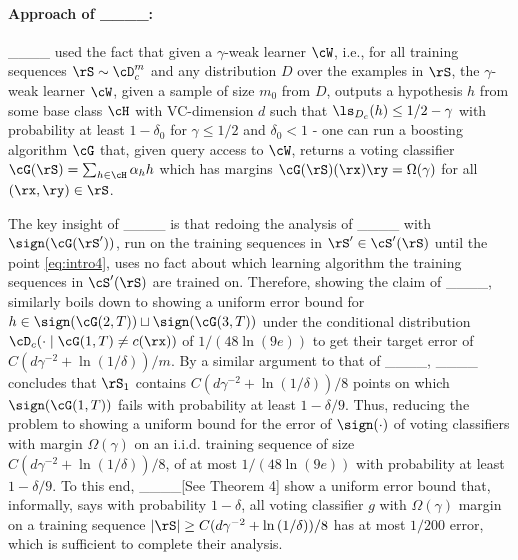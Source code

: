\paragraph{Approach of ____:}
____ used the fact that given a $\gamma$-weak learner $ \cW $, i.e., for all training sequences $\rS\sim \cD_{c}^{m}$ and any distribution $D$ over the examples in $\rS$, the $ \gamma $-weak learner $\cW$, given a sample of size $m_{0}$ from $D$, outputs a hypothesis $h$ from some base class $\cH$ with VC-dimension $d$ such that $\ls_{D_{c}}(h)\leq 1/2-\gamma$ with probability at least $1-\delta_{0}$ for $\gamma\leq 1/2$ and $\delta_{0}< 1$ - one can run a boosting algorithm $\cG$ that, given query access to $\cW$, returns a voting classifier $\cG(\rS)=\sum_{h\in \cH} \alpha_{h}h$ which has margins $\cG(\rS)(\rx)\ry=\Omega(\gamma)$ for all $(\rx,\ry)\in\rS$. 

The key insight of ____ is that redoing the analysis of ____ with $\sign(\cG(\rS'))$, run on the training sequences in $\rS'\in \cS'(\rS)$ until the point \cref{eq:intro4}, uses no fact about which learning algorithm the training sequences in $\cS'(\rS)$ are trained on. Therefore, showing the claim of ____, similarly boils down to showing a uniform error bound for $h\in \sign(\cG(2,T))\sqcup\sign(\cG(3,T))$ under the conditional distribution $ \cD_{c}(\cdot\mid \cG(1,T)\not=c(\rx)) $ of  $1/(48\ln{\left(9e \right)})$ to get their target error of $C(d\gamma^{-2}+\ln{\left(1/\delta \right)})/m$. By a similar argument to that of ____, ____ concludes that $\rS_{1}$ contains $C(d\gamma^{-2}+\ln{\left(1/\delta \right)})/8$ points on which $\sign(\cG(1,T))$ fails with probability at least $ 1-\delta/9 $. Thus, reducing the problem to showing a uniform bound for the error of $ \sign(\cdot) $ of voting classifiers with margin $\Omega(\gamma)$ on an i.i.d. training sequence of size $C(d\gamma^{-2}+\ln{\left(1/\delta \right)})/8$, of at most $1/(48\ln{\left(9e \right)})$ with probability at least $1-\delta/9$. To this end, ____[See Theorem 4] show a uniform error bound that, informally, says with probability $1-\delta$, all voting classifier $ g $  with $\Omega(\gamma)$ margin on a training sequence $|\rS|\geq C(d\gamma^{-2}+\ln{\left(1/\delta \right)})/8$ has at most 
 $ 1/200 $ error, which is sufficient to complete their analysis. 

